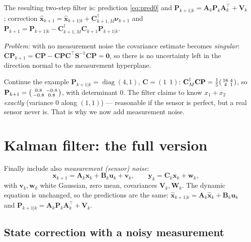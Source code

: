 \documentclass[11pt,a4paper]{article}
\newcommand{\hx}{\hat{\boldsymbol{x}}}
\newcommand{\bx}{\boldsymbol{x}}
\newcommand{\bu}{\boldsymbol{u}}
\newcommand{\by}{\boldsymbol{y}}
\newcommand{\bv}{\boldsymbol{v}}
\newcommand{\bw}{\boldsymbol{w}}
\newcommand{\bnu}{\boldsymbol{\nu}}
\newcommand{\mA}{\mathbf{A}}
\newcommand{\mB}{\mathbf{B}}
\newcommand{\mC}{\mathbf{C}}
\newcommand{\mP}{\mathbf{P}}
\newcommand{\mS}{\mathbf{S}}
\newcommand{\mV}{\mathbf{V}}
\newcommand{\mW}{\mathbf{W}}
\newcommand{\pinv}{^{\dagger}}
\newcommand{\tp}{^{\top}}
\DeclareMathOperator{\diag}{diag}
\newcommand{\slides}[1]{\texorpdfstring{\hspace{0.5em}{\normalfont\small\emph{(#1)}}}{}}
\theoremstyle{plain}
\theoremstyle{definition}
\theoremstyle{remark}
\begin{document}
The resulting two-step filter is: prediction \eqref{eq:pred0} and $\mP_{k+1|k}=\mA_k\mP_k\mA_k\tp+\mV_k$; correction
$\hx_{k+1}=\hx_{k+1|k}+\mC_{k+1,M}\pinv\bnu_{k+1}$ and $\mP_{k+1}=\mP_{k+1|k}-\mC_{k+1,M}\pinv\mC_{k+1}\mP_{k+1|k}$.

\emph{Problem:} with no measurement noise the covariance estimate becomes \emph{singular}: $\mC\mP_{k+1}=\mC\mP-\mC\mP\mC\tp\mS^{-1}\mC\mP=\mathbf 0$,
so there is no uncertainty left in the direction normal to the measurement hyperplane.

\begin{intuition}
Continue the example $\mP_{k+1|k}=\diag(4,1)$, $\mC=(1\ \ 1)$: $\mC_M\pinv\mC\mP=\tfrac15\begin{psmallmatrix}16&4\\4&1\end{psmallmatrix}$, so
$\mP_{k+1}=\begin{psmallmatrix}0.8&-0.8\\-0.8&0.8\end{psmallmatrix}$, with determinant $0$. The filter claims to know $x_1+x_2$ \emph{exactly}
(variance $0$ along $(1,1)$) --- reasonable if the sensor is perfect, but a real sensor never is. That is why we now add measurement noise.
\end{intuition}

\section{Kalman filter: the full version \slides{EKF deck, slides 16--21}}

Finally include also \emph{measurement (sensor) noise}:
\begin{equation}\label{eq:lin-full}
\bx_{k+1}=\mA_k\bx_k+\mB_k\bu_k+\bv_k,\qquad \by_k=\mC_k\bx_k+\bw_k,
\end{equation}
with $\bv_k,\bw_k$ white Gaussian, zero mean, covariances $\mV_k,\mW_k$. The dynamic equation is unchanged, so the predictions
are the same: $\hx_{k+1|k}=\mA_k\hx_k+\mB_k\bu_k$ and $\mP_{k+1|k}=\mA_k\mP_k\mA_k\tp+\mV_k$.

\subsection{State correction with a noisy measurement}
\end{document}
